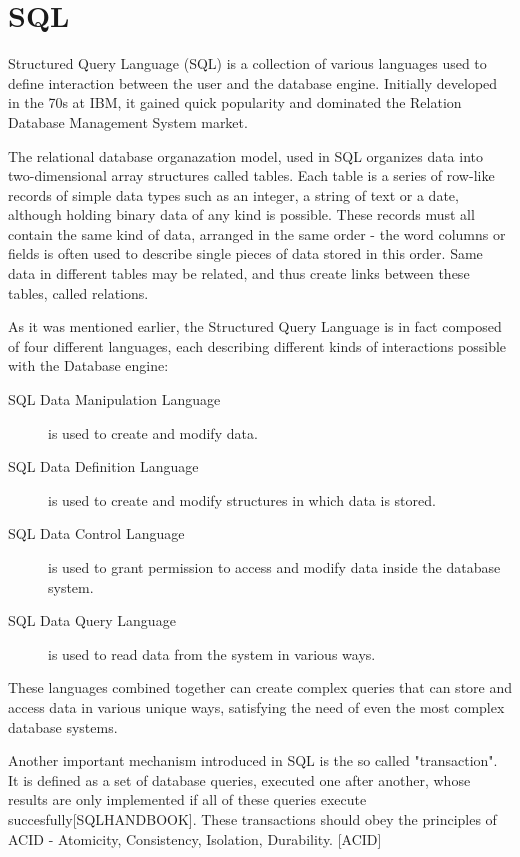 \section{SQL}
\label{sec:background:first_section}
\par Structured Query Language (SQL) is a collection of various languages used to define interaction between the user and the database engine. Initially developed in the 70s at IBM, it gained quick popularity and dominated the Relation Database Management System market.\citep{SQLHandbook} 
\par The relational database organazation model, used in SQL organizes data into two-dimensional array structures called tables. Each table is a series of row-like records of simple data types such as an integer, a string of text or a date, although holding binary data of any kind is possible. These records must all contain the same kind of data, arranged in the same order - the word columns or fields is often used to describe single pieces of data stored in this order. Same data in different tables may be related, and thus create links between these tables, called relations.
\par As it was mentioned earlier, the Structured Query Language is in fact composed of four different languages, each describing different kinds of interactions possible with the Database engine\citep{KreibchSQLite}:
\begin{description}
  \item[SQL Data Manipulation Language] is used to create and modify data.
  \item[SQL Data Definition Language] is used to create and modify structures in which data is stored.
  \item[SQL Data Control Language] is used to grant permission to access and modify data inside the database system.
  \item[SQL Data Query Language] is used to read data from the system in various ways.
\end{description}
\par These languages combined together can create complex queries that can store and access data in various unique ways, satisfying the need of even the most complex database systems.
\par Another important mechanism introduced in SQL is the so called "transaction". It is defined as a set of database queries, executed one after another, whose results are only implemented if all of these queries execute succesfully[SQLHANDBOOK]. These transactions should obey the principles of ACID - Atomicity, Consistency, Isolation, Durability. [ACID]

